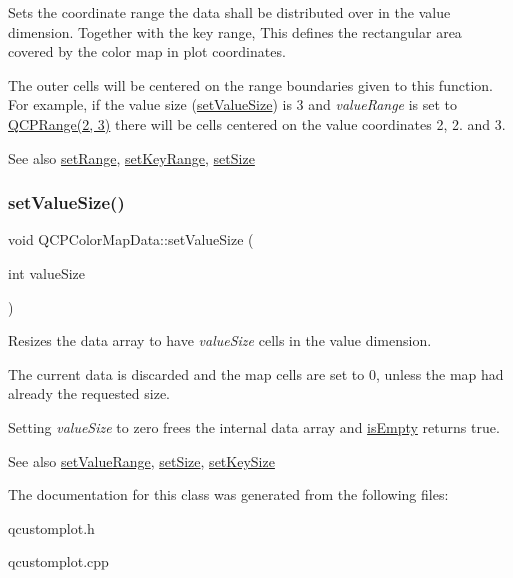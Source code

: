 Sets the coordinate range the data shall be distributed over in the value dimension. Together with the key range, This defines the rectangular area covered by the color map in plot coordinates.

The outer cells will be centered on the range boundaries given to this function. For example, if the value size (\hyperlink{classQCPColorMapData_a0893c9e3914513048b45e3429ffd16f2}{set\+Value\+Size}) is 3 and {\itshape value\+Range} is set to {\ttfamily \hyperlink{classQCPRange}{Q\+C\+P\+Range(2, 3)}} there will be cells centered on the value coordinates 2, 2. and 3.

\begin{DoxySeeAlso}{See also}
\hyperlink{classQCPColorMapData_aad9c1c7c703c1339489fc730517c83d4}{set\+Range}, \hyperlink{classQCPColorMapData_a0738c485f3c9df9ea1241b7a8bb6a86e}{set\+Key\+Range}, \hyperlink{classQCPColorMapData_a0d9ff35c299d0478b682bfbcdd9c097e}{set\+Size} 
\end{DoxySeeAlso}
\mbox{\label{classQCPColorMapData_a0893c9e3914513048b45e3429ffd16f2}} 
\subsubsection{\texorpdfstring{set\+Value\+Size()}{setValueSize()}}
{\footnotesize\ttfamily void Q\+C\+P\+Color\+Map\+Data\+::set\+Value\+Size (\begin{DoxyParamCaption}\item[{int}]{value\+Size }\end{DoxyParamCaption})}

Resizes the data array to have {\itshape value\+Size} cells in the value dimension.

The current data is discarded and the map cells are set to 0, unless the map had already the requested size.

Setting {\itshape value\+Size} to zero frees the internal data array and \hyperlink{classQCPColorMapData_aea88cc75a76ca571acf29b2ba8ac970d}{is\+Empty} returns true.

\begin{DoxySeeAlso}{See also}
\hyperlink{classQCPColorMapData_ada1b2680ba96a5f4175b6d341cf75d23}{set\+Value\+Range}, \hyperlink{classQCPColorMapData_a0d9ff35c299d0478b682bfbcdd9c097e}{set\+Size}, \hyperlink{classQCPColorMapData_ac7ef70e383aface34b44dbde49234b6b}{set\+Key\+Size} 
\end{DoxySeeAlso}


The documentation for this class was generated from the following files\+:\begin{DoxyCompactItemize}
\item 
qcustomplot.\+h\item 
qcustomplot.\+cpp\end{DoxyCompactItemize}
